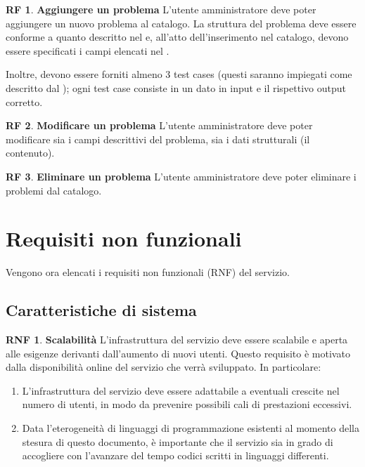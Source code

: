 \documentclass[11pt, a4paper]{article}
\theoremstyle{definition}
\newtheorem{funcreq}{RF} %
\newtheorem{nonfuncreq}{RNF} %
\begin{document}
\begin{funcreq}
\textbf{Aggiungere un problema }
L'utente amministratore deve poter aggiungere un nuovo problema al catalogo.
La struttura del problema deve essere conforme a quanto descritto nel
\textcolor{blue}{}
e, all'atto dell'inserimento nel catalogo, devono essere specificati i campi
elencati nel \textcolor{blue}{}.

Inoltre, devono essere forniti almeno 3 test cases (questi saranno impiegati
come descritto dal \textcolor{blue}{});
ogni test case consiste in un dato in input e il rispettivo output corretto.
\end{funcreq}

\begin{funcreq}
\textbf{Modificare un problema }
L'utente amministratore deve poter modificare sia i campi descrittivi del
problema, sia i dati strutturali (il contenuto).
\end{funcreq}

\begin{funcreq}
\textbf{Eliminare un problema }
L'utente amministratore deve poter eliminare i problemi dal catalogo.
\end{funcreq}

\newpage
\section{Requisiti non funzionali}
Vengono ora elencati i requisiti non funzionali (RNF) del servizio.

\subsection{Caratteristiche di sistema}

\begin{nonfuncreq}
\label{scalabilita}
\textbf{Scalabilità }
L'infrastruttura del servizio deve essere scalabile e aperta alle esigenze
derivanti dall'aumento di nuovi utenti. Questo requisito è motivato dalla
disponibilità online del servizio che verrà sviluppato. In particolare:
\begin{enumerate}
    \item L'infrastruttura del servizio deve essere adattabile a eventuali
    crescite nel numero di utenti, in modo da prevenire possibili cali di
    prestazioni eccessivi.

    \item Data l'eterogeneità di linguaggi di programmazione esistenti
    al momento della stesura di questo documento, è importante che il
    servizio sia in grado di accogliere con l'avanzare del tempo codici
    scritti in linguaggi differenti.
\end{enumerate}
\end{nonfuncreq}
\end{document}
